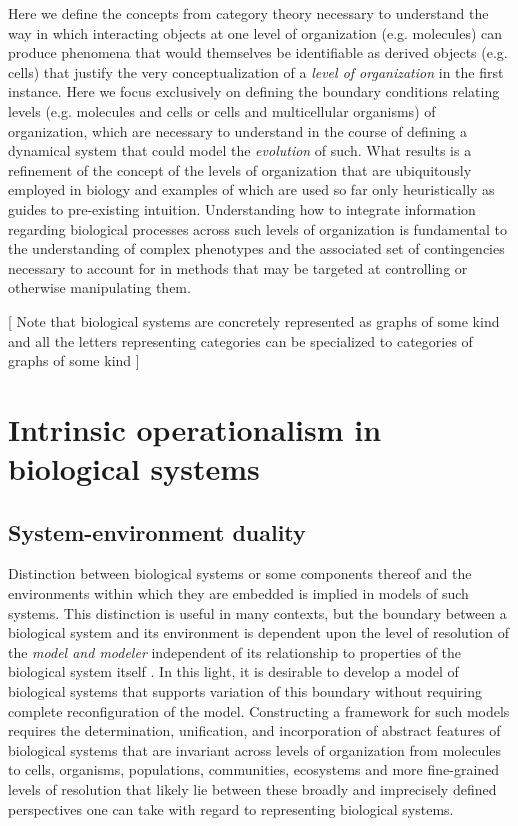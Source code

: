 \documentclass[aps,twocolumn]{revtex4-1}
\begin{document}
Here we define the concepts from category theory necessary to understand the way in which interacting objects at one level of organization (e.g. molecules) can produce phenomena that would themselves be identifiable as derived objects (e.g. cells) that justify the very conceptualization of a \emph{level of organization} in the first instance. Here we focus exclusively on defining the boundary conditions relating levels (e.g. molecules and cells or cells and multicellular organisms) of organization, which are necessary to understand in the course of defining a dynamical system that could model the \emph{evolution} of such. What results is a refinement of the concept of the levels of organization that are ubiquitously employed in biology and examples of which are used so far only heuristically as guides to pre-existing intuition. Understanding how to integrate information regarding biological processes across such levels of organization is fundamental to the understanding of complex phenotypes and the associated set of contingencies necessary to account for in methods that may be targeted at controlling or otherwise manipulating them.

[ Note that biological systems are concretely represented as graphs of some kind and all the letters representing categories can be specialized to categories of graphs of some kind ]

\section{Intrinsic operationalism in biological systems}
\subsection{System-environment duality}
Distinction between biological systems or some components thereof and the environments within which they are embedded is implied in models of such systems. This distinction is useful in many contexts, but the boundary between a biological system and its environment is dependent upon the level of resolution of the \emph{model and modeler} independent of its relationship to properties of the biological system itself \cite{Fontana1996}. In this light, it is desirable to develop a model of biological systems that supports variation of this boundary without requiring complete reconfiguration of the model. Constructing a framework for such models requires the determination, unification, and incorporation of abstract features of biological systems that are invariant across levels of organization from molecules to cells, organisms, populations, communities, ecosystems and more fine-grained levels of resolution that likely lie between these broadly and imprecisely defined perspectives one can take with regard to representing biological systems.
\end{document}
